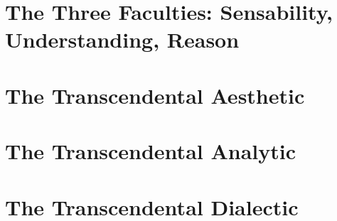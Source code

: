\section*{The Three Faculties: Sensability, Understanding, Reason}

\section*{The Transcendental Aesthetic}

\section*{The Transcendental Analytic}

\section*{The Transcendental Dialectic}
